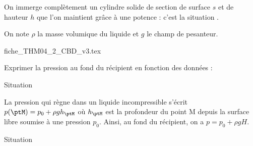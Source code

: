 On immerge complètement un cylindre solide de section de surface $s$ et de hauteur $h$ que l'on maintient grâce à une potence : c'est la situation \reponseB.

 On note $\rho$ la masse volumique du liquide et $g$ le champ de pesanteur.
                                \initialisationPartieDroite %
\def\ratioScaleImage{0.45}
\begin{center}
{fiche_THM04_2_CBD_v3.tex}
\end{center}
                               \finalisationDuPartageDePage %

Exprimer la  pression au fond du récipient en fonction des données :

\debutEntrainement



\begin{enonce}
Situation \reponseA{}
\end{enonce}


\begin{corrige}
La pression qui règne dans un liquide incompressible s'écrit $p(\ptM)=p_0+\rho g h_\ptM$ où $h_\ptM$ est la profondeur du point M depuis la surface libre soumise à une pression $p_0$. Ainsi, au fond du récipient, on a $p=p_0+\rho gH$.
\end{corrige}




\begin{enonce}
Situation \reponseB{}
\end{enonce}

